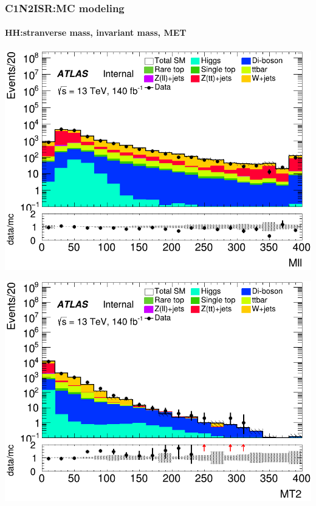 \documentclass[usenames,dvipsnames]{beamer}
\begin{document}
\begin{frame}
\frametitle{C1N2ISR:MC modeling}
\framesubtitle{HH:\quad stranverse mass, invariant mass, MET}
    \begin{minipage}{0.32\textwidth}
        \centering
        \includegraphics[width=\textwidth]{graphics/HH_met/HH_met_Mll.png}
    \end{minipage}
    \hfill
    \begin{minipage}{0.32\textwidth}
        \centering
        \includegraphics[width=\textwidth]{graphics/HH_met/HH_met_MT2.png}
    \end{minipage}
    \hfill
    

\end{frame}
\end{document}
